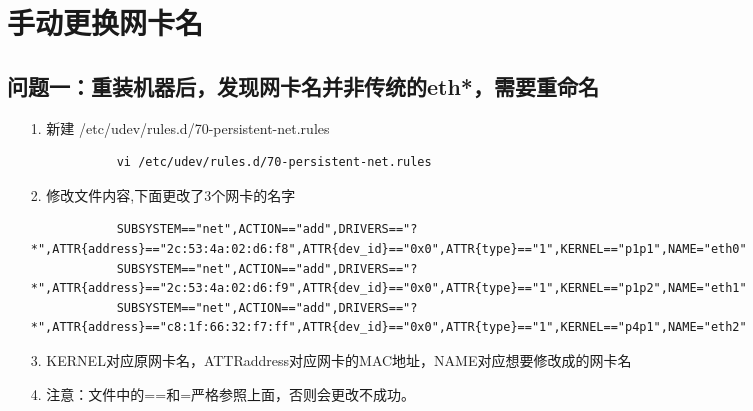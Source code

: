 \documentclass[a4paper,left=1.5cm,right=1.5cm,11pt]{article}
\begin{document}
\tableofcontents

\clearpage


\section{手动更换网卡名}


\subsection{问题一：重装机器后，发现网卡名并非传统的eth*，需要重命名}
\begin{itemize}
	\item[1.] 新建 /etc/udev/rules.d/70-persistent-net.rules
        \begin{lstlisting}
            vi /etc/udev/rules.d/70-persistent-net.rules
        \end{lstlisting}
	\item[2.] 修改文件内容,下面更改了3个网卡的名字
        \begin{lstlisting}
            SUBSYSTEM=="net",ACTION=="add",DRIVERS=="?*",ATTR{address}=="2c:53:4a:02:d6:f8",ATTR{dev_id}=="0x0",ATTR{type}=="1",KERNEL=="p1p1",NAME="eth0"
            SUBSYSTEM=="net",ACTION=="add",DRIVERS=="?*",ATTR{address}=="2c:53:4a:02:d6:f9",ATTR{dev_id}=="0x0",ATTR{type}=="1",KERNEL=="p1p2",NAME="eth1"
            SUBSYSTEM=="net",ACTION=="add",DRIVERS=="?*",ATTR{address}=="c8:1f:66:32:f7:ff",ATTR{dev_id}=="0x0",ATTR{type}=="1",KERNEL=="p4p1",NAME="eth2"
        \end{lstlisting}
	\item[3.]KERNEL对应原网卡名，ATTR{address}对应网卡的MAC地址，NAME对应想要修改成的网卡名
	\item[4.]注意：文件中的==和=严格参照上面，否则会更改不成功。
\end{itemize}
\end{document}
